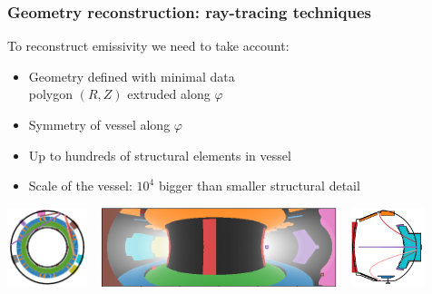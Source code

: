 \documentclass[10pt]{beamer}
\begin{document}
\begin{frame}
\frametitle{Geometry reconstruction: ray-tracing techniques}

	To reconstruct emissivity we need to take account:
	\begin{itemize}
	\item \textcolor{myblue}{Geometry defined with minimal data\\ \hspace{1cm} polygon $(R,Z)$ extruded along $\varphi$}
	\item \textcolor{myblue}{Symmetry of vessel along $\varphi$}
	\item Up to hundreds of structural elements in vessel
	\item Scale of the vessel:
	$10^4$ bigger than smaller structural detail
	\end{itemize}
	
	\vspace{0.5cm}
	\begin{center}
		\includegraphics[height=2.3cm]{figures/confB3_wp_view2.png}%
		~
		\includegraphics[height=2.3cm]{figures/confB3_wp_view1.png}%
		~
		\includegraphics[height=2.3cm]{figures/confB3_wp_view3.png}%
	\end{center}
	
\end{frame}
\end{document}
